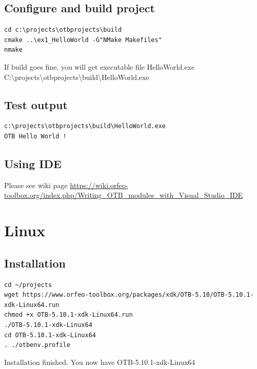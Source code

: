 \documentclass[10pt,a4paper]{article}
\begin{document}
\subsection{Configure and build project}

\begin{verbatim}
cd c:\projects\otbprojects\build
cmake ..\ex1_HelloWorld -G"NMake Makefiles"
nmake
\end{verbatim}
If build goes fine, you will get executable file HelloWorld.exe
\newline
C:{\textbackslash}projects{\textbackslash}otbprojects{\textbackslash}build{\textbackslash}HelloWorld.exe
\newline

\subsection{Test output}

\begin{verbatim}
c:\projects\otbprojects\build\HelloWorld.exe
OTB Hello World !
\end{verbatim}

\subsection{Using IDE}


Please see wiki page \url{https://wiki.orfeo-toolbox.org/index.php/Writing_OTB_modules_with_Visual_Studio_IDE}



\section{Linux}

\subsection{Installation}

\begin{verbatim}
cd ~/projects
wget https://www.orfeo-toolbox.org/packages/xdk/OTB-5.10/OTB-5.10.1-xdk-Linux64.run
chmod +x OTB-5.10.1-xdk-Linux64.run
./OTB-5.10.1-xdk-Linux64
cd OTB-5.10.1-xdk-Linux64
. ./otbenv.profile
\end{verbatim}
Installation finished. You now have OTB-5.10.1-xdk-Linux64
\newline
\end{document}
